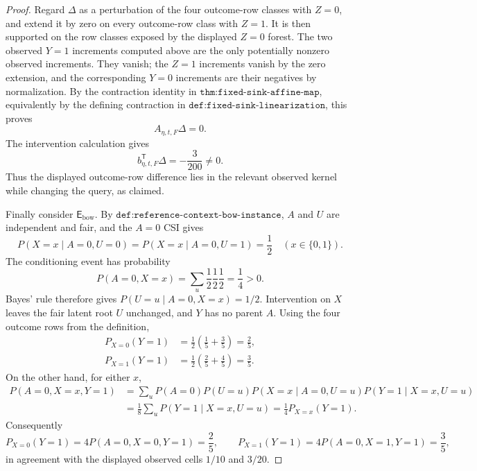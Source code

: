 \documentclass{article}
\begin{document}
\begin{proof}
Regard \(\Delta\) as a perturbation of the four outcome-row classes with \(Z=0\), and extend it by zero on every outcome-row class with \(Z=1\).  It is then supported on the row classes exposed by the displayed \(Z=0\) forest.  The two observed \(Y=1\) increments computed above are the only potentially nonzero observed increments.  They vanish; the \(Z=1\) increments vanish by the zero extension, and the corresponding \(Y=0\) increments are their negatives by normalization.  By the contraction identity in \(\texttt{thm:fixed-sink-affine-map}\), equivalently by the defining contraction in \(\texttt{def:fixed-sink-linearization}\), this proves
\[
 A_{\eta,t,F}\Delta=0.
\]
The intervention calculation gives
\[
 b_{\eta,t,F}^{\mathsf T}\Delta=-\frac3{200}\ne0.
\]
Thus the displayed outcome-row difference lies in the relevant observed kernel while changing the query, as claimed.

Finally consider \(\mathsf E_{\mathrm{bow}}\).  By \(\texttt{def:reference-context-bow-instance}\), \(A\) and \(U\) are independent and fair, and the \(A=0\) CSI gives
\[
 P(X=x\mid A=0,U=0)=P(X=x\mid A=0,U=1)=\frac12
 \quad (x\in\{0,1\}).
\]
The conditioning event has probability
\[
 P(A=0,X=x)=\sum_u\frac12\frac12\frac12=\frac14>0.
\]
Bayes' rule therefore gives \(P(U=u\mid A=0,X=x)=1/2\).  Intervention on \(X\) leaves the fair latent root \(U\) unchanged, and \(Y\) has no parent \(A\).  Using the four outcome rows from the definition,
\[
 \begin{aligned}
 P_{X=0}(Y=1)&=\frac12\left(\frac15+\frac35\right)=\frac25,\\
 P_{X=1}(Y=1)&=\frac12\left(\frac25+\frac45\right)=\frac35.
 \end{aligned}
\]
On the other hand, for either \(x\),
\[
 \begin{aligned}
 P(A=0,X=x,Y=1)
 &=\sum_u P(A=0)P(U=u)P(X=x\mid A=0,U=u)P(Y=1\mid X=x,U=u)\\
 &=\frac18\sum_u P(Y=1\mid X=x,U=u)
 =\frac14 P_{X=x}(Y=1).
 \end{aligned}
\]
Consequently
\[
 P_{X=0}(Y=1)=4P(A=0,X=0,Y=1)=\frac25,
 \qquad
 P_{X=1}(Y=1)=4P(A=0,X=1,Y=1)=\frac35,
\]
in agreement with the displayed observed cells \(1/10\) and \(3/20\).


\end{proof}
\end{document}
